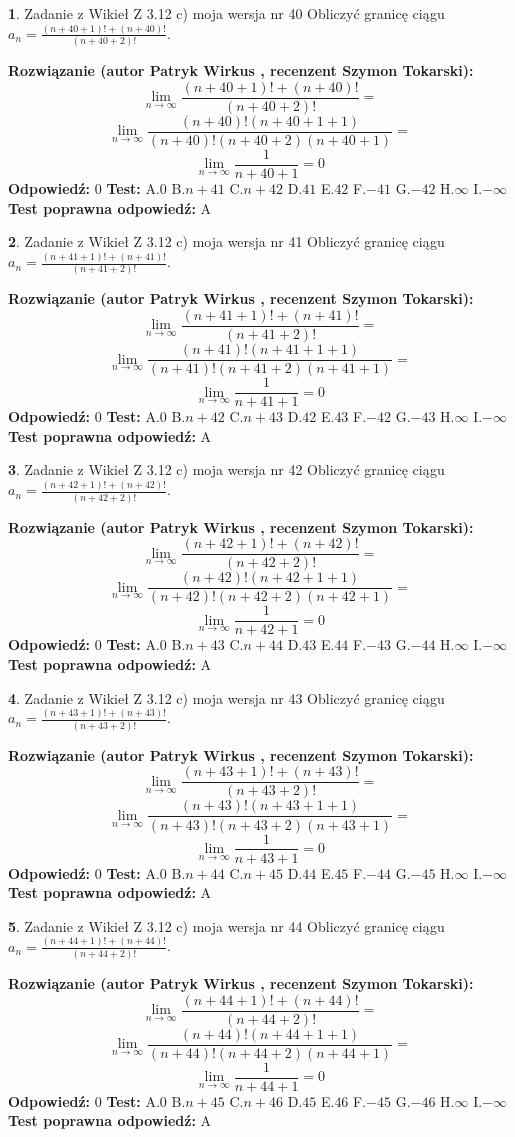 \documentclass[12pt, a4paper]{article}
\theoremstyle{definition} %
\newtheorem{zad}{}
\newcommand{\zadStart}[1]{\begin{zad}#1\newline}
\newcommand{\zadStop}{\end{zad}}
\newcommand{\rozwStart}[2]{\noindent \textbf{Rozwiązanie (autor #1 , recenzent #2): }\newline}
\newcommand{\rozwStop}{\newline}
\newcommand{\odpStart}{\noindent \textbf{Odpowiedź:}\newline}
\newcommand{\odpStop}{\newline}
\newcommand{\testStart}{\noindent \textbf{Test:}\newline}
\newcommand{\testStop}{\newline}
\newcommand{\kluczStart}{\noindent \textbf{Test poprawna odpowiedź:}\newline}
\newcommand{\kluczStop}{\newline}
\begin{document}
\zadStart{Zadanie z Wikieł Z 3.12 c) moja wersja nr 40}
Obliczyć granicę ciągu $a_{n}=\frac{(n+40+1)!+(n+40)!}{(n+40+2)!}$.
\zadStop
\rozwStart{Patryk Wirkus}{Szymon Tokarski}
$$\lim\limits_{n\to\infty}\frac{(n+40+1)!+(n+40)!}{(n+40+2)!}=$$
$$\lim\limits_{n\to\infty}\frac{(n+40)!(n+40+1+1)}{(n+40)!(n+40+2)(n+40+1)}=$$
$$\lim\limits_{n\to\infty}\frac{1}{n+40+1}= 0$$
\rozwStop
\odpStart
$0$
\odpStop
\testStart
A.$0$
B.$n+41$
C.$n+42$
D.$41$
E.$42$
F.$-41$
G.$-42$
H.$\infty$
I.$-\infty$
\testStop
\kluczStart
A
\kluczStop



\zadStart{Zadanie z Wikieł Z 3.12 c) moja wersja nr 41}
Obliczyć granicę ciągu $a_{n}=\frac{(n+41+1)!+(n+41)!}{(n+41+2)!}$.
\zadStop
\rozwStart{Patryk Wirkus}{Szymon Tokarski}
$$\lim\limits_{n\to\infty}\frac{(n+41+1)!+(n+41)!}{(n+41+2)!}=$$
$$\lim\limits_{n\to\infty}\frac{(n+41)!(n+41+1+1)}{(n+41)!(n+41+2)(n+41+1)}=$$
$$\lim\limits_{n\to\infty}\frac{1}{n+41+1}= 0$$
\rozwStop
\odpStart
$0$
\odpStop
\testStart
A.$0$
B.$n+42$
C.$n+43$
D.$42$
E.$43$
F.$-42$
G.$-43$
H.$\infty$
I.$-\infty$
\testStop
\kluczStart
A
\kluczStop



\zadStart{Zadanie z Wikieł Z 3.12 c) moja wersja nr 42}
Obliczyć granicę ciągu $a_{n}=\frac{(n+42+1)!+(n+42)!}{(n+42+2)!}$.
\zadStop
\rozwStart{Patryk Wirkus}{Szymon Tokarski}
$$\lim\limits_{n\to\infty}\frac{(n+42+1)!+(n+42)!}{(n+42+2)!}=$$
$$\lim\limits_{n\to\infty}\frac{(n+42)!(n+42+1+1)}{(n+42)!(n+42+2)(n+42+1)}=$$
$$\lim\limits_{n\to\infty}\frac{1}{n+42+1}= 0$$
\rozwStop
\odpStart
$0$
\odpStop
\testStart
A.$0$
B.$n+43$
C.$n+44$
D.$43$
E.$44$
F.$-43$
G.$-44$
H.$\infty$
I.$-\infty$
\testStop
\kluczStart
A
\kluczStop



\zadStart{Zadanie z Wikieł Z 3.12 c) moja wersja nr 43}
Obliczyć granicę ciągu $a_{n}=\frac{(n+43+1)!+(n+43)!}{(n+43+2)!}$.
\zadStop
\rozwStart{Patryk Wirkus}{Szymon Tokarski}
$$\lim\limits_{n\to\infty}\frac{(n+43+1)!+(n+43)!}{(n+43+2)!}=$$
$$\lim\limits_{n\to\infty}\frac{(n+43)!(n+43+1+1)}{(n+43)!(n+43+2)(n+43+1)}=$$
$$\lim\limits_{n\to\infty}\frac{1}{n+43+1}= 0$$
\rozwStop
\odpStart
$0$
\odpStop
\testStart
A.$0$
B.$n+44$
C.$n+45$
D.$44$
E.$45$
F.$-44$
G.$-45$
H.$\infty$
I.$-\infty$
\testStop
\kluczStart
A
\kluczStop



\zadStart{Zadanie z Wikieł Z 3.12 c) moja wersja nr 44}
Obliczyć granicę ciągu $a_{n}=\frac{(n+44+1)!+(n+44)!}{(n+44+2)!}$.
\zadStop
\rozwStart{Patryk Wirkus}{Szymon Tokarski}
$$\lim\limits_{n\to\infty}\frac{(n+44+1)!+(n+44)!}{(n+44+2)!}=$$
$$\lim\limits_{n\to\infty}\frac{(n+44)!(n+44+1+1)}{(n+44)!(n+44+2)(n+44+1)}=$$
$$\lim\limits_{n\to\infty}\frac{1}{n+44+1}= 0$$
\rozwStop
\odpStart
$0$
\odpStop
\testStart
A.$0$
B.$n+45$
C.$n+46$
D.$45$
E.$46$
F.$-45$
G.$-46$
H.$\infty$
I.$-\infty$
\testStop
\kluczStart
A
\kluczStop
\end{document}
